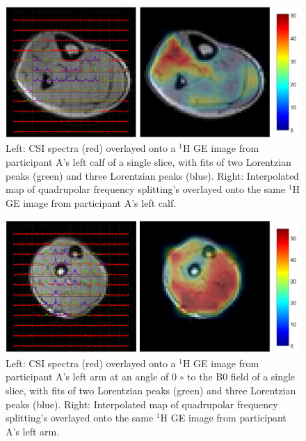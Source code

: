 \documentclass[class=article, crop=false]{standalone}
\begin{document}
\begin{minipage}{\textwidth}
\begin{figure}
    \centering
    \includegraphics[width=1\textwidth]{Figures/Quad/Calf_A.png}
    \caption{Left: CSI spectra (red) overlayed onto a $^1$H GE image from participant A's left calf of a single slice, with fits of two Lorentzian peaks (green) and three Lorentzian peaks (blue). Right: Interpolated map of quadrupolar frequency splitting's overlayed onto the same $^1$H GE image from participant A's left calf. }
    \label{fig:D2O:Calf_A}
\end{figure}
\end{minipage}

\begin{figure}
    \centering
    \includegraphics[width=1\textwidth]{Figures/Quad/Arm_A.png}
    \caption{Left: CSI spectra (red) overlayed onto a $^1$H GE image from participant A's left arm at an angle of 0 ${\circ}$ to the B0 field of a single slice, with fits of two Lorentzian peaks (green) and three Lorentzian peaks (blue). Right: Interpolated map of quadrupolar frequency splitting's overlayed onto the same $^1$H GE image from participant A's left arm. }
    \label{fig:D2O:Arm_A}
\end{figure}
\end{document}
